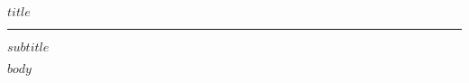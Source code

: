 \documentclass[11pt]{article}
\begin{document}
\vspace*{0.7cm}
\begin{center}
  {\huge\bfseries $title$\par}
\end{center}

\vspace{0.3cm}
\hrule
\vspace{1em}

\begin{center}
  {\large \textcolor{muted}{$subtitle$}}
\end{center}

\vspace{1.2em}

$body$
\end{document}
